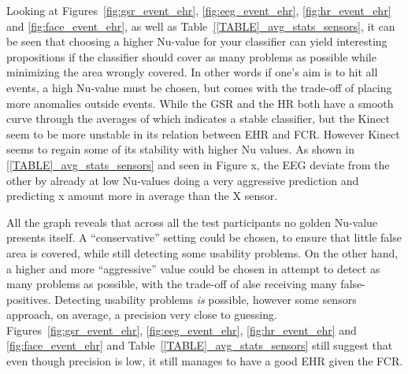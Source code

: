 


Looking at Figures~\ref{fig:gsr_event_ehr}, \ref{fig:eeg_event_ehr}, \ref{fig:hr_event_ehr} and \ref{fig:face_event_ehr},
as well as Table~\ref{[TABLE]_avg_stats_sensors}, it can be seen that choosing a higher Nu-value for your classifier can yield interesting propositions if the classifier should cover as many problems as possible while minimizing the area wrongly covered.
In other words if one's aim is to hit all events, a high Nu-value must be chosen, but comes with the trade-off of placing more anomalies outside events. 
While the GSR and the HR both have a smooth curve through the averages of which indicates a stable classifier, but the Kinect seem to be more unstable in its relation between EHR and FCR. However Kinect seems to regain some of its stability with higher Nu values. As shown in \ref{[TABLE]_avg_stats_sensors} and seen in Figure x, the EEG deviate from the other by already at low Nu-values doing a very aggressive prediction and predicting x amount more in average than the X sensor.

All the graph reveals that across all the test participants no golden Nu-value presents itself. A ``conservative''
setting could be chosen, to ensure that little false area is covered, while still detecting some usability problems. On
the other hand, a higher and more ``aggressive'' value could be chosen in attempt to detect as many problems as
possible, with the trade-off of alse receiving many false-positives. Detecting usability problems \textit{is} possible,
however some sensors approach, on average, a precision very close to guessing.  Figures~\ref{fig:gsr_event_ehr},
\ref{fig:eeg_event_ehr}, \ref{fig:hr_event_ehr} and \ref{fig:face_event_ehr} and Table~\ref{[TABLE]_avg_stats_sensors}
still suggest that even though precision is low, it still manages to have a good EHR given the FCR.